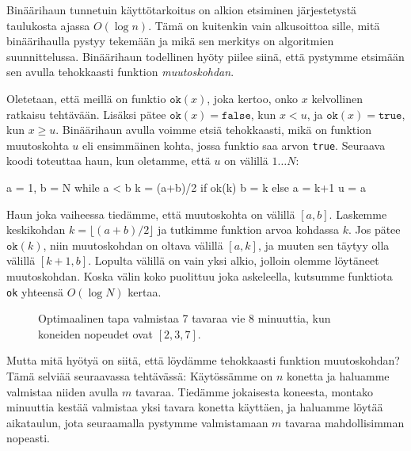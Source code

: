 
Binäärihaun tunnetuin käyttötarkoitus on alkion etsiminen
järjestetystä taulukosta ajassa $O(\log n)$.
Tämä on kuitenkin vain alkusoittoa sille,
mitä binää\-rihaulla pystyy tekemään ja mikä
sen merkitys on algoritmien suunnittelussa.
Binääri\-haun todellinen hyöty piilee siinä,
että pystymme etsimään sen avulla tehokkaasti funktion \emph{muutoskohdan}.

Oletetaan, että meillä on funktio $\texttt{ok}(x)$,
joka kertoo, onko $x$ kelvollinen ratkaisu tehtävään.
Lisäksi pätee $\texttt{ok}(x)=\texttt{false}$, kun $x<u$,
ja $\texttt{ok}(x)=\texttt{true}$, kun $x \ge u$.
Binäärihaun avulla voimme etsiä tehokkaasti,
mikä on funktion muutoskohta $u$
eli ensimmäinen kohta, jossa funktio saa arvon \texttt{true}.
Seuraava koodi toteuttaa haun, kun oletamme, että $u$ on välillä $1 \dots N$:

\begin{code}
a = 1, b = N
while a < b
    k = (a+b)/2
    if ok(k)
        b = k
    else
        a = k+1
u = a
\end{code}

Haun joka vaiheessa tiedämme, että muutoskohta on välillä $[a,b]$.
Laskemme keskikohdan $k=\lfloor (a+b)/2 \rfloor$ ja tutkimme funktion arvoa kohdassa $k$.
Jos pätee $\texttt{ok}(k)$, niin muutoskohdan on oltava välillä $[a,k]$,
ja muuten sen täytyy olla välillä $[k+1,b]$.
Lopulta välillä on vain yksi alkio, jolloin olemme löytäneet muutoskohdan.
Koska välin koko puolittuu joka askeleella,
kutsumme funktiota \texttt{ok} yhteensä $O(\log N)$ kertaa.

\begin{figure}
\center
{}
\caption{Optimaalinen tapa valmistaa 7 tavaraa vie 8 minuuttia,
kun koneiden nopeudet ovat $[2,3,7]$.}
\label{fig:optkon}
\end{figure}

Mutta mitä hyötyä on siitä, että löydämme tehokkaasti funktion muutoskohdan?
Tämä selviää seuraavassa tehtävässä:
Käytössämme on $n$ konetta
ja haluamme valmistaa niiden avulla $m$ tavaraa.
Tiedämme jokaisesta koneesta,
montako minuuttia kestää valmistaa yksi tavara konetta käyttäen,
ja haluamme löytää aikataulun, jota seuraamalla pystymme valmistamaan
$m$ tavaraa mahdollisimman nopeasti.

